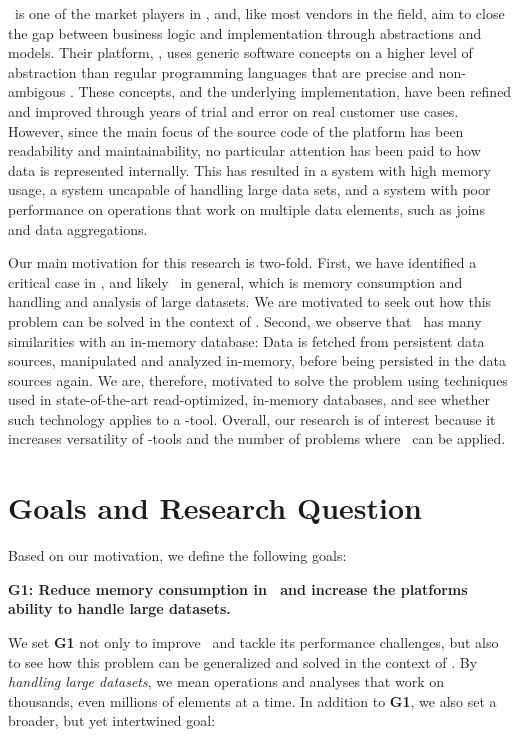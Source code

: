 \genus~is one of the market players in \mde, and, like most vendors in the field, aim to close the gap between business logic and implementation through abstractions and models. Their platform, \gap, uses generic software concepts on a higher level of abstraction than regular programming languages that are precise and non-ambigous \cite{noauthor_undated-qy}. These concepts, and the underlying implementation, have been refined and improved through years of trial and error on real customer use cases. However, since the main focus of the source code of the platform has been readability and maintainability, no particular attention has been paid to how data is represented internally. This has resulted in a system with high memory usage, a system uncapable of handling large data sets, and a system with poor performance on operations that work on multiple data elements, such as joins and data aggregations.

Our main motivation for this research is two-fold. First, we have identified a critical case in \gap, and likely \mde~in general, which is memory consumption and handling and analysis of large datasets. We are motivated to seek out how this problem can be solved in the context of \mdd. Second, we observe that \gap~has many similarities with an in-memory database: Data is fetched from persistent data sources, manipulated and analyzed in-memory, before being persisted in the data sources again. We are, therefore, motivated to solve the problem using techniques used in state-of-the-art read-optimized, in-memory databases, and see whether such technology applies to a \mde-tool. Overall, our research is of interest because it increases versatility of \mdd-tools and the number of problems where \mde~can be applied.

\section{Goals and Research Question}
\label{sec:Goals and Research Question}
Based on our motivation, we define the following goals:

\setlength{\leftskip}{1cm}

\textbf{G1: Reduce memory consumption in \gap~and increase the platforms ability to handle large datasets.}

\setlength{\leftskip}{0pt}

We set \textbf{G1} not only to improve \gap~and tackle its performance challenges, but also to see how this problem can be generalized and solved in the context of \mde. By \textit{handling large datasets}, we mean operations and analyses that work on thousands, even millions of elements at a time. In addition to \textbf{G1}, we also set a broader, but yet intertwined goal:

